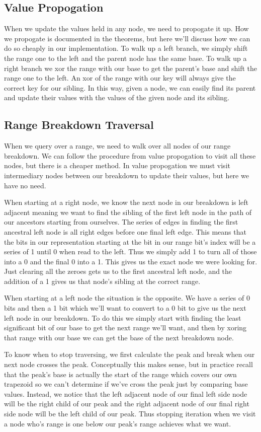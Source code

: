 \documentclass{article}
\begin{document}
\subsection{Value Propogation}

When we update the values held in any node, we need to propogate it up. How we
propogate is documented in the theorems, but here we'll discuss how we can do so
cheaply in our implementation. To walk up a left branch, we simply shift the
range one to the left and the parent node has the same base. To walk up a right
branch we xor the range with our base to get the parent's base and shift the
range one to the left. An xor of the range with our key will always give the
correct key for our sibling. In this way, given a node, we can easily find its parent and
update their values with the values of the given node and its sibling.

\subsection{Range Breakdown Traversal}

When we query over a range, we need to walk over all nodes of our range
breakdown. We can follow the procedure from value propogation to visit all these
nodes, but there is a cheaper method. In value propogation we must visit
intermediary nodes between our breakdown to update their values, but here we
have no need.

When starting at a right node, we know the next node in our breakdown is left
adjacent meaning we want to find the sibling of the first left node in the path
of our ancestors starting from ourselves. The series of edges in finding the
first ancestral left node is all right edges before one final left edge. This
means that the bits in our representation starting at the bit in our range bit's
index will be a series of 1 until 0 when read to the left. Thus we simply add 1
to turn all of those into a 0 and the final 0 into a 1. This gives us the exact
node we were looking for. Just clearing all the zeroes gets us to the first
ancestral left node, and the addition of a 1 gives us that node's sibling at the
correct range.

When starting at a left node the situation is the opposite. We have a series of
0 bits and then a 1 bit which we'll want to convert to a 0 bit to give us the
next left node in our breakdown. To do this we simply start with finding the
least significant bit of our base to get the next range we'll want, and then by
xoring that range with our base we can get the base of the next breakdown node.

To know when to stop traversing, we first calculate the peak and break when our
next node crosses the peak. Conceptually this makes sense, but in practice
recall that the peak's base is actually the start of the range which covers our
own trapezoid so we can't determine if we've cross the peak just by comparing
base values. Instead, we notice that the left adjacent node of our final left
side node will be the right child of our peak and the right adjacent node of our
final right side node will be the left child of our peak. Thus stopping iteration
when we visit a node who's range is one below our peak's range achieves what we
want.
\end{document}
